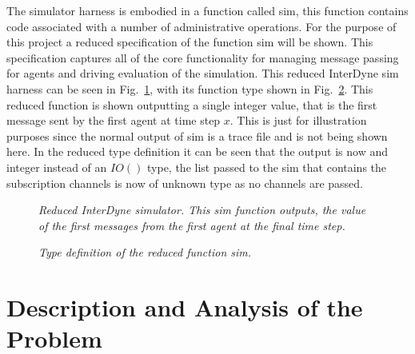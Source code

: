 \documentclass{article}
\begin{document}
The simulator harness is embodied in a function called sim, this function contains code associated with a number of administrative operations. For the purpose of this project a reduced specification of the function sim will be shown. This specification captures all of the core functionality for managing message passing for agents and driving evaluation of the simulation. This reduced InterDyne sim harness can be seen in Fig.~\ref{fig:intersimfun}, with its function type shown in Fig.~\ref{fig:reducedsimtypet}. This reduced function is shown outputting a single integer value, that is the first message sent by the first agent at time step $x$. This is just for illustration purposes since the normal output of sim is a trace file and is not being shown here. In the reduced type definition it can be seen that the output is now and integer instead of an $IO()$ type, the list passed to the sim that contains the subscription channels is now of unknown type as no channels are passed.   
 
\begin{figure}[H]
	\centering
        
	\caption{\it Reduced InterDyne simulator. This sim function outputs, the value of the first messages from the first agent at the final time step.}
	\label{fig:intersimfun}
\end{figure} 

\begin{figure}[H]
	\centering
        
	\caption{\it Type definition of the reduced function sim.}
	\label{fig:reducedsimtypet}
\end{figure} 


%        








\newpage
\section {Description and Analysis of the Problem} \label{despriptionandanalysproblem}
\end{document}
